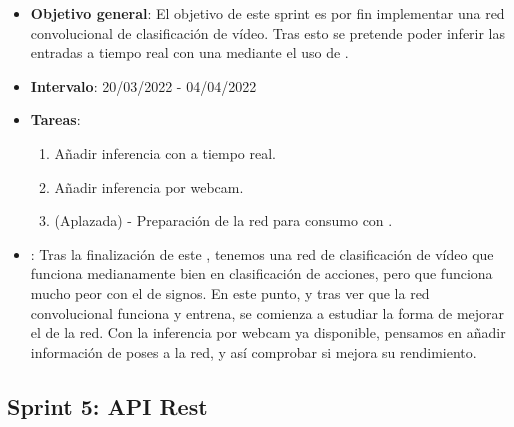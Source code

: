 \begin{itemize}
  \item  \textbf{Objetivo general}: El objetivo de este sprint es por fin implementar una red convolucional de clasificación de vídeo. Tras esto se pretende poder inferir las entradas a tiempo real con una  mediante el uso de .

  \item \textbf{Intervalo}: 20/03/2022 - 04/04/2022

  \item \textbf{Tareas}:
        \begin{enumerate}
          \item Añadir inferencia con  a tiempo real.
          \item Añadir inferencia por webcam.
          \item (Aplazada) - Preparación de la red para consumo con .
        \end{enumerate}

  \item \textbf{}: Tras la finalización de este , tenemos una red de clasificación de vídeo que funciona medianamente bien en clasificación de acciones, pero que funciona mucho peor con el  de signos. En este punto, y tras ver que la red convolucional funciona y entrena, se comienza a estudiar la forma de mejorar el  de la red. Con la inferencia por webcam ya disponible, pensamos en añadir información de poses a la red, y así comprobar si mejora su rendimiento.
\end{itemize}

\subsection{Sprint 5: API Rest}


